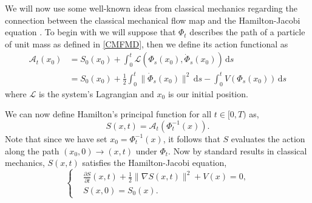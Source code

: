 \documentclass[a4paper,12pt,draft]{report}
\theoremstyle{remark}
\theoremstyle{definition}
\begin{document}
We will now use some well-known ideas from classical mechanics regarding the connection between the classical mechanical flow map and the Hamilton-Jacobi equation \cite{Arnol'd}.  To begin with we will suppose that $\Phi_t$ describes the path of a particle of unit mass as defined in \eqref{CMFMD}, then we define its action functional as
\begin{align}
\mathscr{A}_t(x_0) & = S_0(x_0) + \int_0^t \mathscr{L}(\Phi_s(x_0), \dot{\Phi}_s(x_0)) \,\mathrm{d}s\nonumber\\
& = S_0(x_0) + \frac{1}{2}\int_0^t \|\dot{\Phi}_s(x_0)\|^2 \,\mathrm{d}s - \int_0^t V(\Phi_s(x_0)) \,\mathrm{d}s\nonumber
\end{align}
where $\mathscr{L}$ is the system's Lagrangian and $x_0$ is our initial position.

We can now define Hamilton's principal function for all $t \in [0, T)$ as,
$$
S(x, t) = \mathscr{A}_t(\Phi_t^{-1}(x)).
$$
Note that since we have set $x_0 = \Phi_t^{-1}(x)$, it follows that $S$ evaluates the action along the path $(x_0, 0) \to (x, t)$ under $\Phi_t$.  Now by standard results in classical mechanics, $S(x, t)$ satisfies the Hamilton-Jacobi equation,
\begin{equation}
\left\{
\begin{aligned}
& \frac{\partial S}{\partial t}(x, t) + \frac{1}{2}\|\nabla S(x, t)\|^2 + V(x) = 0,\\ \label{HJE}
& S(x, 0) = S_0(x).
\end{aligned}
\right.
\end{equation}
\end{document}
